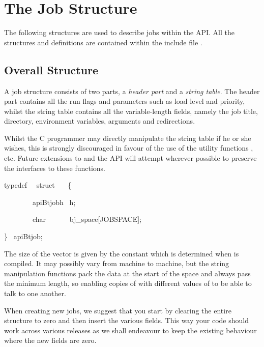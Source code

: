 \chapter{The Job Structure}
\label{chp:the-job-structure}
The following structures are used to describe jobs within the API. All
the structures and definitions are contained within the include file
.

\section{Overall Structure}
\label{bkm:Jobstructure}A job structure consists of two parts, a \textit{header part} and a \textit{string table}. The header part
contains all the run flags and parameters such as load level and priority, whilst the string table contains all the variable-length
fields, namely the job title, directory, environment variables, arguments and redirections.

Whilst the C programmer may directly manipulate the string table if he or she wishes, this is strongly discouraged in favour of the use of the
utility functions \funcXBgettitle{}, \funcXBputtitle{} etc. Future extensions to \ProductName{} and the API will attempt wherever possible to
preserve the interfaces to these functions.

\begin{expara}

typedef \ \ struct \ \ \ \{

\ \ \ \ \ \ \ \ apiBtjobh \ h;

\ \ \ \ \ \ \ \ char \ \ \ \ \ \ bj\_space[JOBSPACE];

\} \ apiBtjob;

\end{expara}

The size of the  vector is given by the constant  which is determined when
\textbf{\ProductName{}} is compiled. It may possibly vary from machine to machine, but the string manipulation functions
pack the data at the start of the space and always pass the minimum length, so enabling copies of \textbf{\ProductName{}} with different values
of  to be able to talk to one another.

When creating new jobs, we suggest that you start by clearing the entire structure to zero and then insert the various fields. This way your
code should work across various releases as we shall endeavour to keep the existing behaviour where the new fields are zero.

